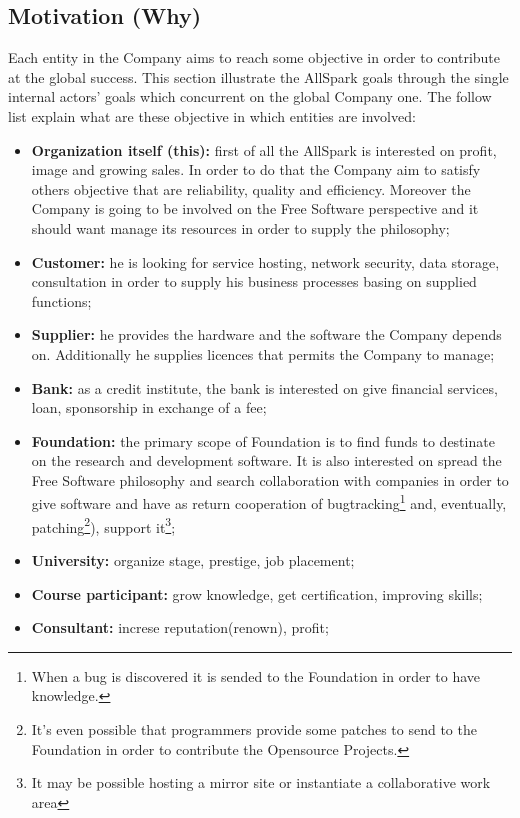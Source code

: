 \subsection{Motivation (Why)}
\label{subsec:scope[Motivation]}
Each entity in the Company aims to reach some objective in order to contribute at the global success. This section illustrate the AllSpark goals through the single internal actors' goals which concurrent on the global Company one. The follow list explain what are these objective in which entities are involved:
\begin{itemize}
 \item {\bf Organization itself (this):} first of all the AllSpark is interested on profit, image and growing sales. In order to do that the Company aim to satisfy others objective that are reliability, quality and efficiency. Moreover the Company is going to be involved on the Free Software perspective and it should want manage its resources in order to supply the philosophy;
 \item {\bf Customer:} he is looking for service hosting, network security, data storage, consultation in order to supply his business processes basing on supplied functions;
 \item {\bf Supplier:} he provides the hardware and the software the Company depends on. Additionally he supplies licences that permits the Company to manage;
 \item {\bf Bank:} as a credit institute, the bank is interested on give financial services, loan, sponsorship in exchange of a fee;
 \item {\bf Foundation:} the primary scope of Foundation is to find funds to destinate on the research and development software. It is also interested on spread the Free Software philosophy and search collaboration with companies in order to give software and have as return cooperation of bugtracking\footnote{When a bug is discovered it is sended to the Foundation in order to have knowledge.} and, eventually, patching\footnote{It's even possible that programmers provide some patches to send to the Foundation in order to contribute the Opensource Projects.}), support it\footnote{It may be possible hosting a mirror site or instantiate a collaborative work area};
 \item {\bf University:} organize stage, prestige, job placement;
 \item {\bf Course participant:} grow knowledge, get certification, improving skills;
 \item {\bf Consultant:} increse reputation(renown), profit;
\end{itemize}

